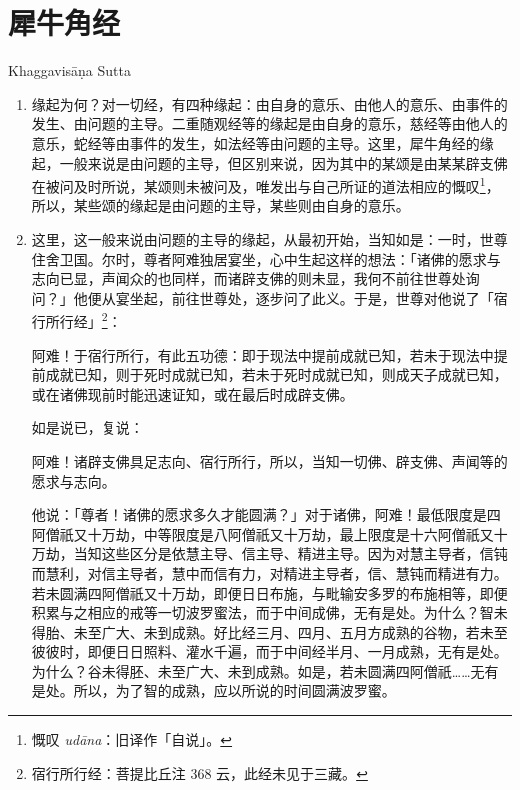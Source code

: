 \section{犀牛角经}

\begin{center}Khaggavisāṇa Sutta\end{center}\vspace{1em}

\begin{enumerate}\item 缘起为何？对一切经，有四种缘起：由自身的意乐、由他人的意乐、由事件的发生、由问题的主导。二重随观经等的缘起是由自身的意乐，慈经等由他人的意乐，蛇经等由事件的发生，如法经等由问题的主导。这里，犀牛角经的缘起，一般来说是由问题的主导，但区别来说，因为其中的某颂是由某某辟支佛在被问及时所说，某颂则未被问及，唯发出与自己所证的道法相应的慨叹\footnote{慨叹 \textit{udāna}：旧译作「自说」。}，所以，某些颂的缘起是由问题的主导，某些则由自身的意乐。
\item 这里，这一般来说由问题的主导的缘起，从最初开始，当知如是：一时，世尊住舍卫国。尔时，尊者阿难独居宴坐，心中生起这样的想法：「诸佛的愿求与志向已显，声闻众的也同样，而诸辟支佛的则未显，我何不前往世尊处询问？」他便从宴坐起，前往世尊处，逐步问了此义。于是，世尊对他说了「宿行所行经」\footnote{宿行所行经：菩提比丘注 368 云，此经未见于三藏。}：\begin{quoting}阿难！于宿行所行，有此五功德：即于现法中提前成就已知，若未于现法中提前成就已知，则于死时成就已知，若未于死时成就已知，则成天子成就已知，或在诸佛现前时能迅速证知，或在最后时成辟支佛。\end{quoting}如是说已，复说：\begin{quoting}阿难！诸辟支佛具足志向、宿行所行，所以，当知一切佛、辟支佛、声闻等的愿求与志向。\end{quoting}他说：「尊者！诸佛的愿求多久才能圆满？」对于诸佛，阿难！最低限度是四阿僧祇又十万劫，中等限度是八阿僧祇又十万劫，最上限度是十六阿僧祇又十万劫，当知这些区分是依慧主导、信主导、精进主导。因为对慧主导者，信钝而慧利，对信主导者，慧中而信有力，对精进主导者，信、慧钝而精进有力。若未圆满四阿僧祇又十万劫，即便日日布施，与毗输安多罗的布施相等，即便积累与之相应的戒等一切波罗蜜法，而于中间成佛，无有是处。为什么？智未得胎、未至广大、未到成熟。好比经三月、四月、五月方成熟的谷物，若未至彼彼时，即便日日照料、灌水千遍，而于中间经半月、一月成熟，无有是处。为什么？谷未得胚、未至广大、未到成熟。如是，若未圆满四阿僧祇……无有是处。所以，为了智的成熟，应以所说的时间圆满波罗蜜。

\end{enumerate}
